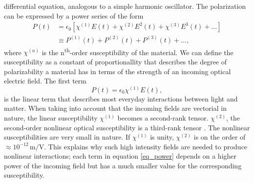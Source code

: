 differential equation, analogous to a simple harmonic oscillator. The
polarization can be expressed by a power series of the form
\begin{align}
{P}(t)
&= \epsilon_{0}\left[\chi^{(1)}{E}(t) 
 + \chi^{(2)}{E}^{2}(t)
 + \chi^{(3)}{E}^{3}(t)
 + \ldots\right]\label{eq_power}\\
&\equiv {P}^{(1)}(t) + {P}^{(2)}(t) + {P}^{(3)}(t) + \ldots,
\end{align}
where $\chi^{(n)}$ is the n\textsuperscript{th}-order susceptibility of the
material. We can define the susceptibility as a constant of proportionallity
that describes the degree of polarizability a material has in terms of the
strength of an incoming optical electric field. The first term
\begin{equation}
P(t) = \epsilon_{0}\chi^{(1)}E(t),
\end{equation}
is the linear term that describes most everyday interactions between light and
matter. When taking into account that the incoming fields are vectorial in
nature, the linear susceptibility $\chi^{(1)}$ becomes a second-rank tensor.
$\chi^{(2)}$, the second-order nonlinear optical susceptibility is a third-rank
tensor \cite{boyd2003nonlinear}. The nonlinear susceptibilities are very small
in nature. If $\chi^{(1)}$ is unity, $\chi^{(2)}$ is on the order of $\approx
10^{-12}\,\text{m/V}$. This explains why such high intensity fields are needed
to produce nonlinear interactions; each term in equation \eqref{eq_power}
depends on a higher power of the incoming field but has a much smaller value for
the corresponding susceptibility.

